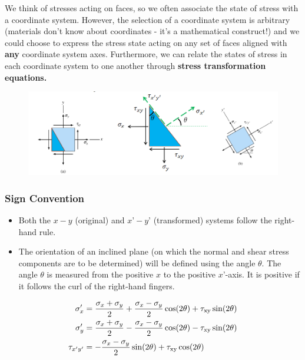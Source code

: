 \noindent We think of stresses acting on faces, so we often associate the state of stress with a coordinate system. However, the selection of a coordinate system is arbitrary (materials don't know about coordinates - it's a mathematical construct!) and we could choose to express the stress state acting on any set of faces aligned with \textbf{any} coordinate system axes. Furthermore, we can relate the states of stress in each coordinate system to one another through \textbf{stress transformation equations.}

\begin{figure}[!h]
\centering
\includegraphics[angle=0, width=5in]{Stress Transformation-Figures/Plane Transformation.png}
\vspace{-2mm}
\caption{\small {}}
\vspace{-3mm}
\label{Fig:PlaneTransform}
\end{figure}

\subsubsection{Sign Convention}

\begin{itemize}
    \item Both the $x-y$ (original) and $x’-y’$ (transformed) systems follow the right-hand rule.
    \item The orientation of an inclined plane (on which the normal and shear stress components are to be determined) will be defined using the angle $\theta$. The angle $\theta$ is measured from the positive $x$ to the positive $x’$-axis. It is positive if it follows the curl of the right-hand fingers.
\end{itemize}

\[\begin{align}
\sigma_x' &= \frac{\sigma_x + \sigma_y}{2} + \frac{\sigma_x - \sigma_y}{2}\rm\cos(2\theta) + \tau_{xy}\sin(2\theta) \\
\sigma_y' &= \frac{\sigma_x + \sigma_y}{2} - \frac{\sigma_x - \sigma_y}{2}\rm\cos(2\theta) - \tau_{xy}\sin(2\theta) \\
\tau_{x'y'} &= -\frac{\sigma_x - \sigma_y}{2}\rm\sin(2\theta) + \tau_{xy}\cos(2\theta)
\end{align}\]

